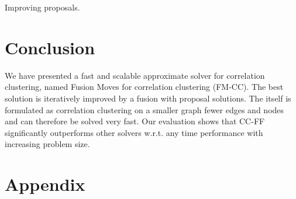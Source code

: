 \documentclass[10pt,twocolumn,letterpaper]{article}
\begin{document}
Improving proposals.




\section{Conclusion}\label{sec:conclusion}

We have presented a fast and scalable 
approximate solver for correlation 
clustering, named Fusion Moves for correlation clustering (FM-CC).
The best solution is iteratively improved 
by a fusion with proposal solutions.
The itself is formulated as correlation
clustering on a smaller graph fewer edges and nodes
and can therefore be solved very fast.
Our evaluation shows that CC-FF
significantly outperforms 
other solvers w.r.t. any time performance 
with increasing problem size.


    


\newpage

\FloatBarrier
{\small


}

\newpage

\onecolumn
\section{Appendix}








\end{document}
